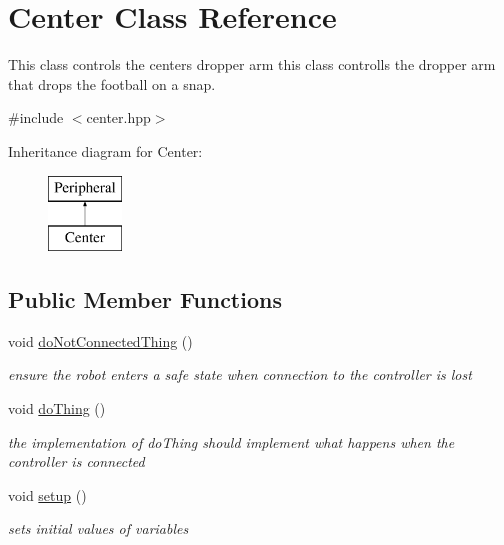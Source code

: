 \hypertarget{class_center}{}\section{Center Class Reference}
\label{class_center}


This class controls the centers dropper arm this class controlls the dropper arm that drops the football on a snap.  




{\ttfamily \#include $<$center.\+hpp$>$}

Inheritance diagram for Center\+:\begin{figure}[H]
\begin{center}
\leavevmode
\includegraphics[height=2.000000cm]{class_center}
\end{center}
\end{figure}
\subsection*{Public Member Functions}
\begin{DoxyCompactItemize}
\item 
\mbox{\label{class_center_a0fe884e8c678da837a4e6082ff344161}} 
void \mbox{\hyperlink{class_center_a0fe884e8c678da837a4e6082ff344161}{do\+Not\+Connected\+Thing}} ()
\begin{DoxyCompactList}\small\item\em ensure the robot enters a safe state when connection to the controller is lost \end{DoxyCompactList}\item 
\mbox{\label{class_center_aa5fc180da844ce0bb60f163f1a819640}} 
void \mbox{\hyperlink{class_center_aa5fc180da844ce0bb60f163f1a819640}{do\+Thing}} ()
\begin{DoxyCompactList}\small\item\em the implementation of do\+Thing should implement what happens when the controller is connected \end{DoxyCompactList}\item 
\mbox{\label{class_center_a0b3dfd6c02ca9e0331db19fbaa026626}} 
void \mbox{\hyperlink{class_center_a0b3dfd6c02ca9e0331db19fbaa026626}{setup}} ()
\begin{DoxyCompactList}\small\item\em sets initial values of variables \end{DoxyCompactList}\end{DoxyCompactItemize}


